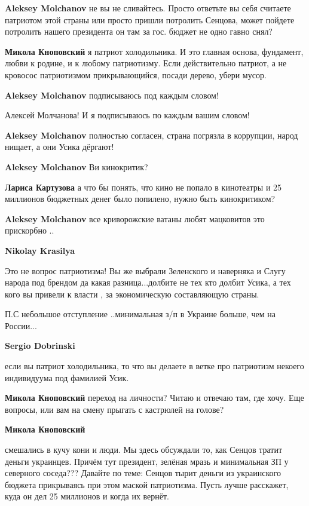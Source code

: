 \begin{itemize}
\begin{itemize}
\textbf{Aleksey Molchanov} не вы не сливайтесь. Просто ответьте вы себя считаете патриотом этой страны или просто пришли потролить Сенцова, может пойдете потролить нашего президента он там за гос. бюджет не одно гавно снял?

\textbf{Микола Кноповский} я патриот холодильника. И это главная основа, фундамент, любви к родине, и к любому патриотизму. Если действительно патриот, а не кровосос патриотизмом прикрывающийся, посади дерево, убери мусор.

\textbf{Aleksey Molchanov} подписываюсь под каждым словом!

Алексей Молчанова! И я подписываюсь по каждым вашим словом!

\textbf{Aleksey Molchanov} полностью согласен, страна погрязла в коррупции, народ нищает, а они Усика дёргают!

\textbf{Aleksey Molchanov} Ви кинокритик?

\textbf{Лариса Картузова} а что бы понять, что кино не попало в кинотеатры и 25 миллионов бюджетных денег было попилено, нужно быть кинокритиком?

\textbf{Aleksey Molchanov} все криворожские ватаны любят мацковитов это прискорбно ..

\textbf{Nikolay Krasilya} 

Это не вопрос патриотизма! Вы же выбрали Зеленского и наверняка и Слугу народа
под брендом да какая разница...долбите не тех кто долбит Усика, а тех кого вы
привели к власти , за экономическую составляющую страны.

П.С небольшое отступление ..минимальная з/п в Украине больше, чем на России...

\textbf{Sergio Dobrinski} 

если вы патриот холодильника, то что вы делаете в ветке про патриотизм некоего
индивидуума под фамилией Усик.

\textbf{Микола Кноповский} переход на личности? Читаю и отвечаю там, где хочу. Еще вопросы, или вам на смену прыгать с кастрюлей на голове?

\textbf{Микола Кноповский} 

смешались в кучу кони и люди. Мы здесь обсуждали то, как Сенцов тратит деньги
украинцев. Причём тут президент, зелёная мразь и минимальная ЗП у северного
соседа??? Давайте по теме: Сенцов тырит деньги из украинского бюджета
прикрываясь при этом маской патриотизма. Пусть лучше расскажет, куда он дел 25
миллионов и когда их вернёт.


\end{itemize}
\end{itemize}

